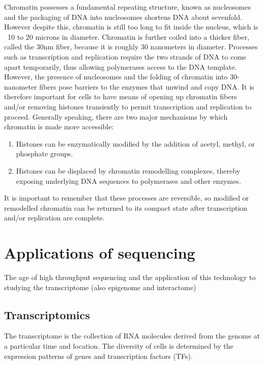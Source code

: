 Chromatin possesses a fundamental repeating structure\cite{holde01111974}, known as nucleosomes and the packaging of DNA into nucleosomes shortens DNA about sevenfold. However despite this, chromatin is still too long to fit inside the nucleus, which is ~10 to 20 microns in diameter. Chromatin is further coiled into a thicker fiber, called the 30nm fiber, because it is roughly 30 nanometers in diameter. Processes such as transcription and replication require the two strands of DNA to come apart temporarily, thus allowing polymerases access to the DNA template. However, the presence of nucleosomes and the folding of chromatin into 30-nanometer fibers pose barriers to the enzymes that unwind and copy DNA. It is therefore important for cells to have means of opening up chromatin fibers and/or removing histones transiently to permit transcription and replication to proceed. Generally speaking, there are two major mechanisms by which chromatin is made more accessible:

\begin{enumerate}
   \item Histones can be enzymatically modified by the addition of acetyl, methyl, or phosphate groups.
   \item Histones can be displaced by chromatin remodelling complexes, thereby exposing underlying DNA sequences to polymerases and other enzymes.
\end{enumerate}

It is important to remember that these processes are reversible, so modified or remodelled chromatin can be returned to its compact state after transcription and/or replication are complete.

\section{Applications of sequencing}

The age of high throughput sequencing and the application of this technology to studying the transcriptome (also epigenome and interactome)

\subsection{Transcriptomics}

The transcriptome is the collection of RNA molecules derived from the genome at a particular time and location. The diversity of cells is determined by the expression patterns of genes and transcription factors (TFs).

